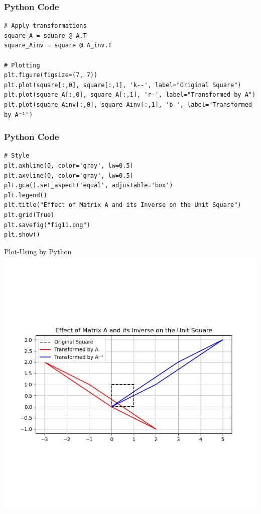 \documentclass{beamer}
\begin{document}
\begin{frame}[fragile]
    \frametitle{Python Code}
    \begin{lstlisting}
# Apply transformations
square_A = square @ A.T
square_Ainv = square @ A_inv.T

# Plotting
plt.figure(figsize=(7, 7))
plt.plot(square[:,0], square[:,1], 'k--', label="Original Square")
plt.plot(square_A[:,0], square_A[:,1], 'r-', label="Transformed by A")
plt.plot(square_Ainv[:,0], square_Ainv[:,1], 'b-', label="Transformed by A⁻¹")
\end{lstlisting}
\end{frame}


\begin{frame}[fragile]
    \frametitle{Python Code}
    \begin{lstlisting}
# Style
plt.axhline(0, color='gray', lw=0.5)
plt.axvline(0, color='gray', lw=0.5)
plt.gca().set_aspect('equal', adjustable='box')
plt.legend()
plt.title("Effect of Matrix A and its Inverse on the Unit Square")
plt.grid(True)
plt.savefig("fig11.png")
plt.show()
\end{lstlisting}
\end{frame}

\begin{frame}{Plot-Using by Python}
    \centering
    \includegraphics[width=\columnwidth, height=0.8\textheight, keepaspectratio]{Figs/fig11.png}     
\end{frame}
\end{document}
